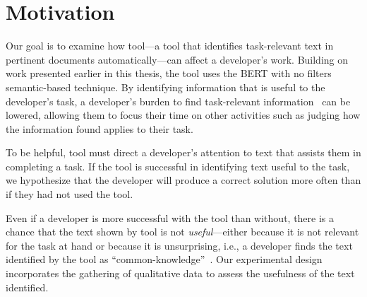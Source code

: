 


\section{Motivation}
\label{cp6:method}



Our goal is to examine how \acs{tool}---a tool that 
 identifies
task-relevant text in pertinent
documents automatically---can affect a developer's work.
Building on work presented earlier in this
thesis, the tool  uses the BERT with no filters semantic-based technique.
By identifying information that is useful to the developer's task,
a developer's burden to find task-relevant information~\cite{Robillard2015}
can be lowered,
allowing them to focus their time on other activities such as judging how the information found applies to their task.


To be helpful, \acs{tool} must direct a developer's attention to text that assists them in completing a task.
If the tool is successful in identifying text useful to the task, we hypothesize that
the developer will produce a correct solution more often than if they had not used the tool.


Even if a developer is more successful
with the tool than without, there is a chance that the text shown by \acs{tool} is not \textit{useful}---either because it is not relevant for the task at hand or because it is unsurprising, i.e.,
a developer finds the text identified by the tool as ``common-knowledge''~\cite{cwalina2008, Robillard2015}. Our experimental design incorporates the gathering of qualitative data to assess the usefulness of the text identified.

 

